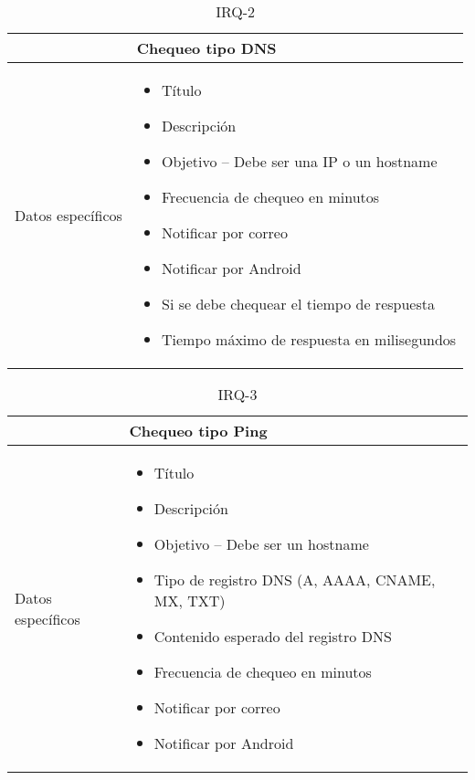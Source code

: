 \begin{table}[h!]
  \centering
  \begin{tabularx}{\textwidth}{|l|X|}
    \hline

    & Chequeo tipo DNS \\

    \hline
    Datos específicos &

    \begin{itemize}
      \item Título 
      \item Descripción
      \item Objetivo -- Debe ser una IP o un hostname
      \item Frecuencia de chequeo en minutos
      \item Notificar por correo
      \item Notificar por Android
      \item Si se debe chequear el tiempo de respuesta
      \item Tiempo máximo de respuesta en milisegundos
    \end{itemize}
    \\
    
    \hline
    
  \end{tabularx}
  \caption{IRQ-2}
\end{table}

\begin{table}[h!]
  \centering
  \begin{tabularx}{\textwidth}{|l|X|}
    \hline

    & Chequeo tipo Ping \\

    \hline
    Datos específicos &

    \begin{itemize}
      \item Título 
      \item Descripción
      \item Objetivo -- Debe ser un hostname
      \item Tipo de registro DNS (A, AAAA, CNAME, MX, TXT)
      \item Contenido esperado del registro DNS
      \item Frecuencia de chequeo en minutos
      \item Notificar por correo
      \item Notificar por Android
    \end{itemize}
    \\
    
    \hline
    
  \end{tabularx}
  \caption{IRQ-3}
\end{table}

